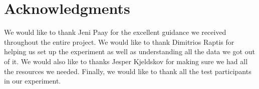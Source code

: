 \section{Acknowledgments}
We would like to thank Jeni Paay for the excellent guidance we received throughout the entire project. 
We would like to thank Dimitrios Raptis for helping us set up the experiment as well as understanding all the data we got out of it. 
We would also like to thanks Jesper Kjeldskov for making sure we had all the resources we needed.
Finally, we would like to thank all the test participants in our experiment.
